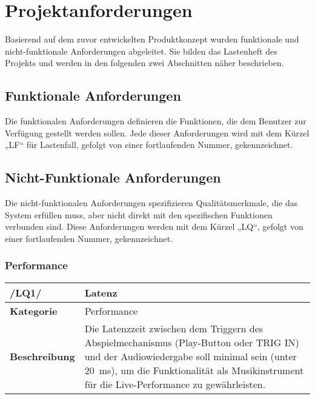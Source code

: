\newpage
\section{Projektanforderungen}

Basierend auf dem zuvor entwickelten Produktkonzept wurden funktionale und nicht-funktionale Anforderungen abgeleitet. Sie bilden das Lastenheft des Projekts und werden in den folgenden zwei Abschnitten näher beschrieben.

\subsection{Funktionale Anforderungen}
Die funktionalen Anforderungen definieren die Funktionen, die dem Benutzer zur Verfügung gestellt werden sollen. Jede dieser Anforderungen wird mit dem Kürzel „LF“ für Lastenfall, gefolgt von einer fortlaufenden Nummer, gekennzeichnet.





\newpage

\subsection{Nicht-Funktionale Anforderungen}
Die nicht-funktionalen Anforderungen spezifizieren Qualitätsmerkmale, die das System erfüllen muss, aber nicht direkt mit den spezifischen Funktionen verbunden sind. Diese Anforderungen werden mit dem Kürzel „LQ“, gefolgt von einer fortlaufenden Nummer, gekennzeichnet.


\subsubsection{Performance}

\begin{table}[h!]
	\begin{tabularx}{\textwidth}{|l|X|}
		\hline
		\textbf{/LQ1/} & \textbf{Latenz} \\ \hline
		\textbf{Kategorie} & Performance \\ \hline
		\textbf{Beschreibung} & Die Latenzzeit zwischen dem Triggern des Abspielmechanismus (Play-Button oder TRIG IN) und der Audiowiedergabe soll minimal sein (unter \SI{20}{\milli\second}), um die Funktionalität als Musikinstrument für die Live-Performance zu gewährleisten. \\ \hline
	\end{tabularx}
\end{table}

